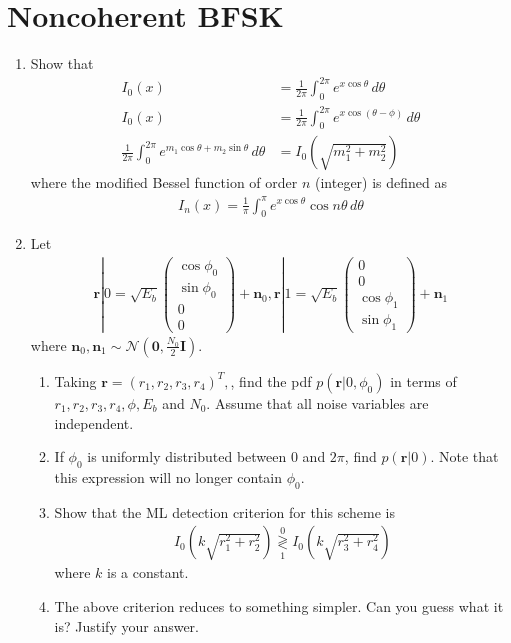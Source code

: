 \documentclass[journal,10pt,twocolumn]{IEEEtran}
\providecommand{\brak}[1]{\ensuremath{\left(#1\right)}}
\providecommand{\dec}[2]{\ensuremath{\overset{#1}{\underset{#2}{\gtrless}}}}
\newcommand{\myvec}[1]{\ensuremath{\begin{pmatrix}#1\end{pmatrix}}}
\begin{document}
\section{Noncoherent BFSK}
\begin{enumerate}
\item
Show that
%
\begin{align}
I_{0}(x) &= \frac{1}{2\pi}\int_{0}^{2\pi}e^{x\cos\theta}\,d\theta \\
I_{0}(x) &= \frac{1}{2\pi}\int_{0}^{2\pi}e^{x\cos\brak{\theta-\phi}}\,d\theta \\
\frac{1}{2\pi}\int_{0}^{2\pi}e^{m_1\cos\theta + m_2\sin\theta}\,d\theta &= I_0\brak{\sqrt{m_1^2+m_2^2}} 
\end{align}
%
where the modified Bessel function of order $n$ (integer) is defined as 
%
\begin{align}
I_{n}(x) = \frac{1}{\pi}\int_{0}^{\pi}e^{x\cos\theta}\cos n\theta\,d\theta
\end{align}
\item
Let
%
\begin{align}
\mathbf{r}|0= \sqrt{E_b}
\myvec{
\cos \phi_0\\
\sin \phi_0 \\
0\\
0
}
+\mathbf{n}_0,
\mathbf{r}|1= \sqrt{E_b}
\myvec{
0\\
0 \\
\cos \phi_1\\
\sin \phi_1 
}
+\mathbf{n}_1
\end{align}
%
where $\mathbf{n}_0,\mathbf{n}_1\sim \mathcal{N}\brak{\mathbf{0}, \frac{N_0}{2}\mathbf{I}}$.
%
\begin{enumerate}[label=(\alph{enumii})]
\item Taking $\mathbf{r} = \brak{r_1,r_2,r_3,r_4}^{T},$, find the pdf $p\brak{\mathbf{r}|0,\phi_0}$ in
terms of $r_1,r_2,r_3,r_4,\phi,E_b$ and $N_0$. Assume that all noise variables are independent.
%
\item 
If $\phi_0$ is uniformly distributed between 0 and $2\pi$, find $p\brak{\mathbf{r}|0}$.  Note that this expression will no longer contain $\phi_0$.
%
\item
Show that the ML detection criterion for this scheme is
%
\begin{align}
I_0\brak{k\sqrt{r_1^2+r_2^2}}\dec{0}{1}I_0\brak{k\sqrt{r_3^2+r_4^2}}
\end{align}
%
where $k$ is a constant.
%
\item 
The above criterion reduces to something simpler.  Can you guess what it is?  Justify your answer.

\end{enumerate}
\end{enumerate}
\end{document}
